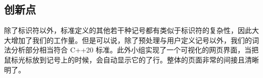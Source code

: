 \newpage

\subsection{创新点}

除了标识符以外，标准定义的其他若干种记号都有类似于标识符的复杂性，因此大大增加了我们的工作量。但是可以说，除了预处理与用户定义记号以外，我们的词法分析部分相当符合 C++20 标准。此外小组实现了一个可视化的网页界面，当把鼠标光标放到记号上的时候，会自动显示它的了行。整体的页面非常的间接且清晰明了。